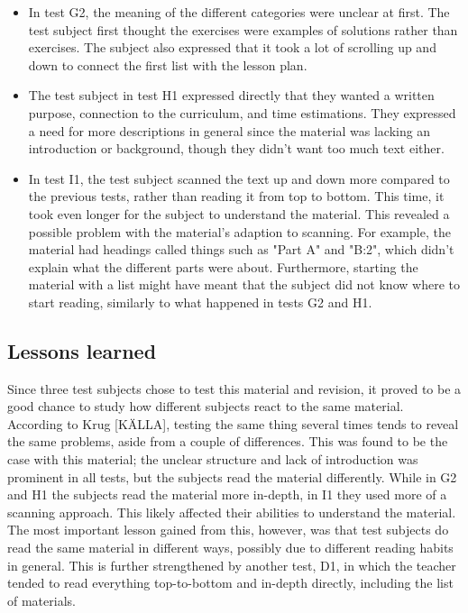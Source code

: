 \begin{itemize}
  \item In test G2, the meaning of the different categories were unclear at first. The test subject first thought the exercises were examples of solutions rather than exercises. The subject also expressed that it took a lot of scrolling up and down to connect the first list with the lesson plan.
  \item The test subject in test H1 expressed directly that they wanted a written purpose, connection to the curriculum, and time estimations. They expressed a need for more descriptions in general since the material was lacking an introduction or background, though they didn't want too much text either.
  \item In test I1, the test subject scanned the text up and down more compared to the previous tests, rather than reading it from top to bottom. This time, it took even longer for the subject to understand the material. This revealed a possible problem with the material's adaption to scanning. For example, the material had headings called things such as "Part A" and "B:2", which didn't explain what the different parts were about. Furthermore, starting the material with a list might have meant that the subject did not know where to start reading, similarly to what happened in tests G2 and H1.
\end{itemize}

\subsection{Lessons learned}

Since three test subjects chose to test this material and revision, it proved to be a good chance to study how different subjects react to the same material. According to Krug [KÄLLA], testing the same thing several times tends to reveal the same problems, aside from a couple of differences. This was found to be the case with this material; the unclear structure and lack of introduction was prominent in all tests, but the subjects read the material differently. While in G2 and H1 the subjects read the material more in-depth, in I1 they used more of a scanning approach. This likely affected their abilities to understand the material. The most important lesson gained from this, however, was that test subjects do read the same material in different ways, possibly due to different reading habits in general. This is further strengthened by another test, D1, in which the teacher tended to read everything top-to-bottom and in-depth directly, including the list of materials.

